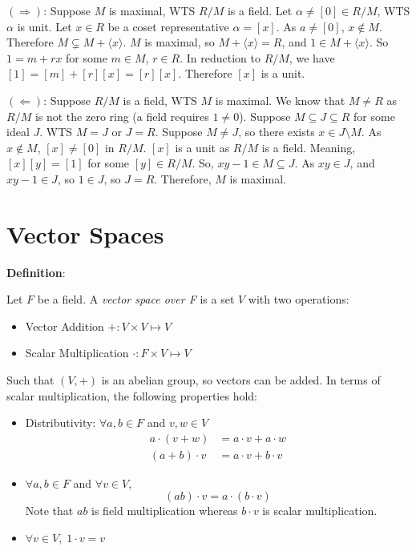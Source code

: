 \documentclass{article}
\begin{document}
\begin{multicols*}{2}
$(\Rightarrow)$: Suppose $M$ is maximal, WTS $R/M$ is a field. Let $\alpha \neq [0] \in R/M$, WTS $\alpha$ is unit. Let $x \in R$ be a coset representative $\alpha = [x]$. As $a\neq[0]$, $x \notin M$. Therefore $M \subsetneq M + \langle x \rangle$. $M$ is maximal, so $M + \langle x \rangle = R$, and $1 \in M + \langle x \rangle$. So $1 = m + rx$ for some $m \in M$, $r \in R$. In reduction to $R/M$, we have $[1] = [m] + [r][x] = [r][x]$. Therefore $[x]$ is a unit.

$(\Leftarrow)$: Suppose $R/M$ is a field, WTS $M$ is maximal. We know that $M \neq R$ as $R/M$ is not the zero ring (a field requires $1 \neq 0$). Suppose $M \subseteq J \subseteq R$ for some ideal $J$. WTS $M=J$ or $J= R$. Suppose $M \neq J$, so there exists $x \in J \setminus M$. As $x \notin M$, $[x] \neq [0]$ in $R/M$. $[x]$ is a unit as $R/M$ is a field. Meaning, $[x][y] = [1]$ for some $[y] \in R/M$. So, $xy - 1 \in M \subseteq J$. As $xy \in J$, and $xy-1 \in J$, so $1 \in J$, so $J = R$. Therefore, $M$ is maximal.

\section{Vector Spaces}

\textbf{Definition}:

Let $F$ be a field. A \textit{vector space over F} is a set $V$ with two operations:

\begin{itemize}
    \item Vector Addition $+ : V \times V \mapsto V$
    \item Scalar Multiplication $\cdot : F \times V \mapsto V$
\end{itemize}

Such that $(V, +)$ is an abelian group, so vectors can be added. In terms of scalar multiplication, the following properties hold:

\begin{itemize}
    \item Distributivity: $\forall a, b \in F$ and $v, w \in V$\[\begin{aligned}
        a \cdot ( v + w) &= a\cdot v + a \cdot w \\
        (a +b )\cdot v &= a\cdot v + b \cdot v
    \end{aligned}\]
    \item $\forall a, b \in F$ and $\forall v \in V$, \[(ab)\cdot v = a \cdot (b \cdot v)\] Note that $ab$ is field multiplication whereas $b \cdot v$ is scalar multiplication.
    \item $\forall v \in V,\;1\cdot v = v$
\end{itemize}


\end{multicols*}
\end{document}
